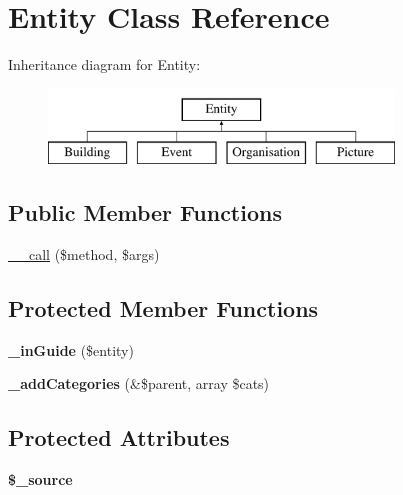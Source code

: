 \hypertarget{classEntity}{
\section{Entity Class Reference}
\label{classEntity}
}
Inheritance diagram for Entity:\begin{figure}[H]
\begin{center}
\leavevmode
\includegraphics[height=2.000000cm]{classEntity}
\end{center}
\end{figure}
\subsection*{Public Member Functions}
\begin{DoxyCompactItemize}
\item 
\hyperlink{classEntity_ad8b26b78887e3f23f5cc696507508b46}{\_\-\_\-call} (\$method, \$args)
\end{DoxyCompactItemize}
\subsection*{Protected Member Functions}
\begin{DoxyCompactItemize}
\item 
\hypertarget{classEntity_af65b30c8cef32429bcd0dbb00afa0707}{
{\bfseries \_\-inGuide} (\$entity)}
\label{classEntity_af65b30c8cef32429bcd0dbb00afa0707}

\item 
\hypertarget{classEntity_a6611412760c0fabd05a2af61b72d6c75}{
{\bfseries \_\-addCategories} (\&\$parent, array \$cats)}
\label{classEntity_a6611412760c0fabd05a2af61b72d6c75}

\end{DoxyCompactItemize}
\subsection*{Protected Attributes}
\begin{DoxyCompactItemize}
\item 
\hypertarget{classEntity_a6288ef0b62489b511da6b63f6a8b458b}{
{\bfseries \$\_\-source}}
\label{classEntity_a6288ef0b62489b511da6b63f6a8b458b}

\end{DoxyCompactItemize}
